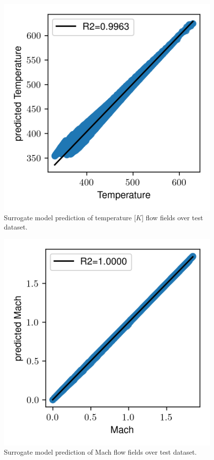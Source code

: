\documentclass[10pt,oneside,a4paper,twocolumn]{article}
\begin{document}
\begin{figure}[htbp]
  \centering
  \includegraphics[width=\columnwidth]{figures/results/Temperature.png}
  \caption{Surrogate model prediction of temperature [$K$] flow fields over test dataset.}
  \label{fig:r2_temperature}
\end{figure}

\begin{figure}[htbp]
  \centering
  \includegraphics[width=\columnwidth]{figures/results/Mach.png}
  \caption{Surrogate model prediction of Mach flow fields over test dataset.}
  \label{fig:r2_mach}
\end{figure}
\end{document}
